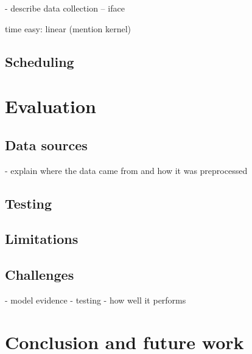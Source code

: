 \documentclass[a4paper,12pt,twoside,openright]{report}
\begin{document}
- describe data collection
-- iface


time easy: linear (mention kernel)




\section{Scheduling} 



\chapter{Evaluation} 

\section{Data sources}
- explain where the data came from and how it was preprocessed
\section{Testing}
\section{Limitations}
\section{Challenges} %

- model evidence
- testing
- how well it performs


\chapter{Conclusion and future work} 
\end{document}
